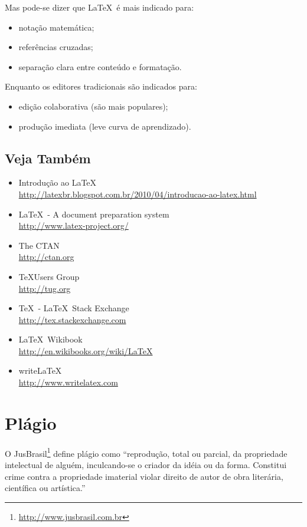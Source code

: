 Mas pode-se dizer que \LaTeX\ é mais indicado para:
\begin{itemize}
	\item notação matemática;
	\item referências cruzadas;
	\item separação clara entre conteúdo e formatação.
\end{itemize}

Enquanto os editores tradicionais são indicados para:
\begin{itemize}
	\item edição colaborativa (são mais populares);
	\item produção imediata (leve curva de aprendizado).
\end{itemize}

\subsection{Veja Também}
\begin{itemize}
	\item Introdução ao \LaTeX
		\\\url{http://latexbr.blogspot.com.br/2010/04/introducao-ao-latex.html}
	\item \LaTeX\ - A document preparation system
		\\\url{http://www.latex-project.org/}
	\item The \acrlong{CTAN}
		\\\url{http://ctan.org}
	\item \TeX Users Group
		\\\url{http://tug.org}
	\item \TeX\ - \LaTeX\ Stack Exchange
		\\\url{http://tex.stackexchange.com}
	\item \LaTeX\ Wikibook
		\\\url{http://en.wikibooks.org/wiki/LaTeX}
	\item write\LaTeX
		\\\url{http://www.writelatex.com}
\end{itemize}

\section{Plágio}%
O JusBrasil\footnote{\url{http://www.jusbrasil.com.br}} define plágio como
``reprodução, total ou parcial, da propriedade intelectual de alguém, inculcando-se
o criador da idéia ou da forma. Constitui crime contra a propriedade imaterial
violar direito de autor de obra literária, científica ou artística.''


